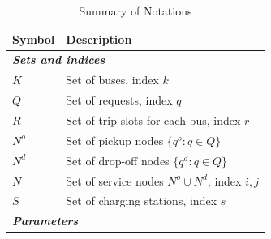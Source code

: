 \documentclass[11pt]{article}
\begin{document}
\renewcommand{\arraystretch}{1.2}

\begin{longtable}{ll}
\caption{Summary of Notations}
\label{tab:notation} \\
\toprule
\textbf{Symbol} & \textbf{Description} \\
\midrule
\endhead

\multicolumn{2}{l}{\textit{\textbf{Sets and indices}}} \\

$K$ & Set of buses, index $k$ \\
$Q$ & Set of requests, index $q$ \\
$R$ & Set of trip slots for each bus, index $r$ \\
$N^o$ & Set of pickup nodes $\{q^o:q\in Q\}$ \\
$N^d$ & Set of drop-off nodes $\{q^d:q\in Q\}$ \\
$N$ & Set of service nodes $N^o \cup N^d$, index $i,j$ \\
$S$ & Set of charging stations, index $s$ \\

\multicolumn{2}{l}{\textit{\textbf{Parameters}}} \\


\end{longtable}
\end{document}
